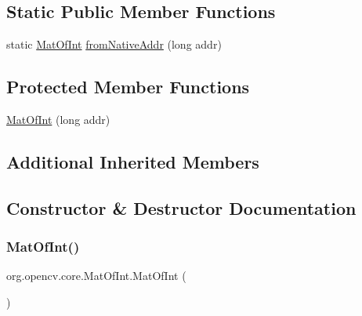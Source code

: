 \subsection*{Static Public Member Functions}
\begin{DoxyCompactItemize}
\item 
static \mbox{\hyperlink{classorg_1_1opencv_1_1core_1_1_mat_of_int}{Mat\+Of\+Int}} \mbox{\hyperlink{classorg_1_1opencv_1_1core_1_1_mat_of_int_ae564d3eb9dfba05e08486051b3d44878}{from\+Native\+Addr}} (long addr)
\end{DoxyCompactItemize}
\subsection*{Protected Member Functions}
\begin{DoxyCompactItemize}
\item 
\mbox{\hyperlink{classorg_1_1opencv_1_1core_1_1_mat_of_int_a001a0a121125766433d7247c7adbda8c}{Mat\+Of\+Int}} (long addr)
\end{DoxyCompactItemize}
\subsection*{Additional Inherited Members}


\subsection{Constructor \& Destructor Documentation}
\mbox{\label{classorg_1_1opencv_1_1core_1_1_mat_of_int_a2cbf6720675cdbc1ffe48411ce5b310a}} 
\subsubsection{\texorpdfstring{Mat\+Of\+Int()}{MatOfInt()}\hspace{0.1cm}{\footnotesize\ttfamily [1/4]}}
{\footnotesize\ttfamily org.\+opencv.\+core.\+Mat\+Of\+Int.\+Mat\+Of\+Int (\begin{DoxyParamCaption}{ }\end{DoxyParamCaption})}

\mbox{\label{classorg_1_1opencv_1_1core_1_1_mat_of_int_a001a0a121125766433d7247c7adbda8c}} 
